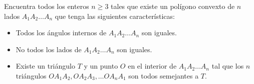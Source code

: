 Encuentra todos los enteros $n\geq 3$ tales que existe un polígono convexto de $n$ lados $A_1A_2\dots A_n$ que tenga las siguientes características:
 \begin{itemize} 
 \item  Todos los ángulos internos de $A_1A_2\dots A_n$ son iguales. 
 \item  No todos los lados de $A_1A_2\dots A_n$ son iguales.
 \item  Existe un triángulo $T$ y un punto $O$ en el interior de $A_1A_2\dots A_n$ tal que los $n$ triángulos $OA_1A_2, OA_2A_3,\dots OA_nA_1$ son todos semejantes a $T$.
 \end{itemize} 